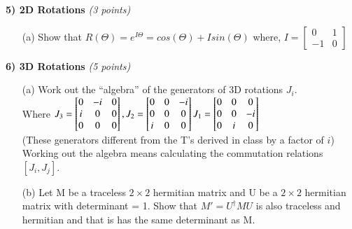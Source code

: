 {\newpage

\textbf{5) 2D Rotations } \hfill \textit{(3 points)}
\begin{itemize}
\item[(a)]Show that $R(\Theta) = e^{I\Theta} = cos(\Theta)+ I sin(\Theta)$
where, $I =  \begin{bmatrix}
    0 & 1  \\
    -1 & 0
  \end{bmatrix} $
\end{itemize}
}

\vspace*{0.25in}

\textbf{6) 3D Rotations } \hfill \textit{(5 points)}
\begin{itemize}
\item[(a)]Work out the ``algebra'' of the generators of 3D rotations $J_i$. \\
Where $
J_3 =  \begin{bmatrix}    0 & -i & 0  \\ i & 0  & 0 \\ 0 & 0 & 0 \end{bmatrix}, 
\hfill
 J_2 =  \begin{bmatrix}    0 & 0 & -i  \\ 0 & 0  & 0 \\ i & 0 & 0 \end{bmatrix} 
\hfill
 J_1 =  \begin{bmatrix}    0 & 0 & 0  \\ 0 & 0  & -i \\ 0 & i & 0 \end{bmatrix} 
$\\
(These generators different from the T's derived in class by a factor of $i$)\\
Working out the algebra means calculating the commutation relations $[J_i,J_j]$.
\item[(b)]Let M be a traceless $2\times2$ hermitian matrix and U be a $2\times2$  hermitian matrix with determinant = 1.  
Show that $M' = U^{\dagger}MU$ is also traceless and hermitian and that is has the same determinant as M.
\end{itemize}





